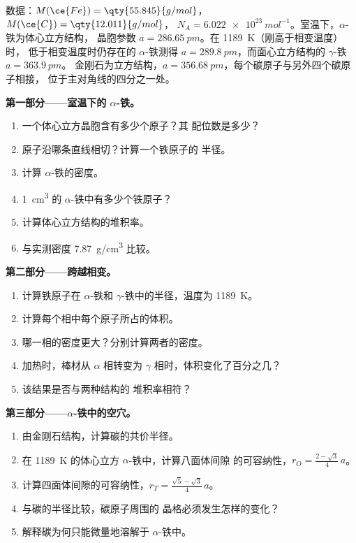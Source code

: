 \begin{problem}
\label{pb:b1:crystals-metals:1}
数据：$M(\ce{Fe}) = \qty{55.845}{g/mol}$，$M(\ce{C}) = \qty{12.011}{g/mol}$，
$N_A = \qty{6.022e23}{mol^{-1}}$。室温下，$\alpha$-铁为体心立方结构，
晶胞参数 $a = \qty{286.65}{pm}$。在 \qty{1189}{K}（刚高于相变温度）时，
低于相变温度时仍存在的 $\alpha$-铁测得
$a = \qty{289.8}{pm}$，而面心立方结构的 $\gamma$-铁 $a = \qty{363.9}{pm}$。
金刚石为立方结构，$a = \qty{356.68}{pm}$，每个碳原子与另外四个碳原子相接，
位于主对角线的四分之一处。

\medskip
\noindent\textbf{第一部分——室温下的 $\alpha$-铁。}
\begin{enumerate}
  \item 一个体心立方晶胞含有多少个原子？其
        配位数是多少？
  \item 原子沿哪条直线相切？计算一个铁原子的
        半径。
  \item 计算 $\alpha$-铁的密度。
  \item \qty{1}{cm^3} 的 $\alpha$-铁中有多少个铁原子？
  \item 计算体心立方结构的堆积率。
  \item 与实测密度 \qty{7.87}{g/cm^3} 比较。
\end{enumerate}

\medskip
\noindent\textbf{第二部分——跨越相变。}
\begin{enumerate}[resume]
  \item 计算铁原子在 $\alpha$-铁和
        $\gamma$-铁中的半径，温度为 \qty{1189}{K}。
  \item 计算每个相中每个原子所占的体积。
  \item 哪一相的密度更大？分别计算两者的密度。
  \item 加热时，棒材从 $\alpha$ 相转变为
        $\gamma$ 相时，体积变化了百分之几？
  \item 该结果是否与两种结构的
        堆积率相符？
\end{enumerate}

\medskip
\noindent\textbf{第三部分——$\alpha$-铁中的空穴。}
\begin{enumerate}[resume]
  \item 由金刚石结构，计算碳的共价半径。
  \item 在 \qty{1189}{K} 的体心立方 $\alpha$-铁中，计算八面体间隙
        的可容纳性，$r_O = \frac{2 - \sqrt3}{4}\,a$。
  \item 计算四面体间隙的可容纳性，$r_T = \frac{\sqrt5 -
        \sqrt3}{4}\,a$。
  \item 与碳的半径比较，碳原子周围的
        晶格必须发生怎样的变化？
  \item 解释碳为何只能微量地溶解于
        $\alpha$-铁中。
\end{enumerate}


\end{problem}
